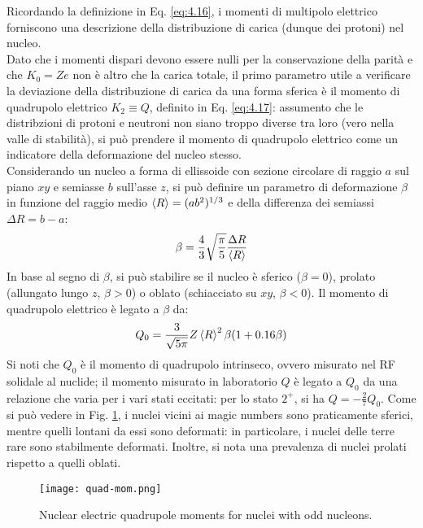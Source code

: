 Ricordando la definizione in Eq. \ref{eq:4.16}, i momenti di multipolo elettrico forniscono una descrizione della distribuzione di carica (dunque dei protoni) nel nucleo.\\
Dato che i momenti dispari devono essere nulli per la conservazione della parità e che $ K_0 = Ze $ non è altro che la carica totale, il primo parametro utile a verificare la deviazione della distribuzione di carica da una forma sferica è il momento di quadrupolo elettrico $ K_2 \equiv Q $, definito in Eq. \ref{eq:4.17}: assumento che le distribzioni di protoni e neutroni non siano troppo diverse tra loro (vero nella valle di stabilità), si può prendere il momento di quadrupolo elettrico come un indicatore della deformazione del nucleo stesso.\\
Considerando un nucleo a forma di ellissoide con sezione circolare di raggio $ a $ sul piano $ xy $ e semiasse $ b $ sull'asse $ z $, si può definire un parametro di deformazione $ \beta $ in funzione del raggio medio $ \braket{R} = (ab^2)^{1/3} $ e della differenza dei semiassi $ \Delta R = b - a $:
\begin{equation}
	\beta = \frac{4}{3} \sqrt{\frac{\pi}{5}} \frac{\Delta R}{\braket{R}}
	\label{eq:5.9}
\end{equation}
In base al segno di $ \beta $, si può stabilire se il nucleo è sferico ($ \beta = 0 $), prolato (allungato lungo $ z $, $ \beta > 0 $) o oblato (schiacciato su $ xy $, $ \beta < 0 $). Il momento di quadrupolo elettrico è legato a $ \beta $ da:
\begin{equation}
	Q_0 = \frac{3}{\sqrt{5\pi}} Z \braket{R}^2 \beta (1 + 0.16 \beta)
	\label{eq:5.10}
\end{equation}
Si noti che $ Q_0 $ è il momento di quadrupolo intrinseco, ovvero misurato nel RF solidale al nuclide; il momento misurato in laboratorio $ Q $ è legato a $ Q_0 $ da una relazione che varia per i vari stati eccitati: per lo stato $ 2^+ $, si ha $ Q = - \frac{2}{7} Q_0 $.
Come si può vedere in Fig. \ref{quad-mom}, i nuclei vicini ai magic numbers sono praticamente sferici, mentre quelli lontani da essi sono deformati: in particolare, i nuclei delle terre rare sono stabilmente deformati. Inoltre, si nota una prevalenza di nuclei prolati rispetto a quelli oblati.

\begin{figure}[!t]
	\centering
	\texttt{[image: quad-mom.png]}
	\caption{Nuclear electric quadrupole moments for nuclei with odd nucleons.}
	\label{quad-mom}
\end{figure}

